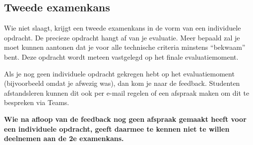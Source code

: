 \subsection{Tweede examenkans}%
\label{subs:tweede-examenkans}

Wie niet slaagt, krijgt een tweede examenkans in de vorm van een individuele opdracht. De precieze opdracht hangt af van je evaluatie. Meer bepaald zal je moet kunnen aantonen dat je voor alle technische criteria minstens ``bekwaam'' bent. Deze opdracht wordt meteen vastgelegd op het finale evaluatiemoment.

Als je nog geen individuele opdracht gekregen hebt op het evaluatiemoment (bijvoorbeeld omdat je afwezig was), dan kom je naar de feedback. Studenten afstandsleren kunnen dit ook per e-mail regelen of een afspraak maken om dit te bespreken via Teams.

\textbf{Wie na afloop van de feedback nog geen afspraak gemaakt heeft voor een individuele opdracht, geeft daarmee te kennen niet te willen deelnemen aan de 2e examenkans.}